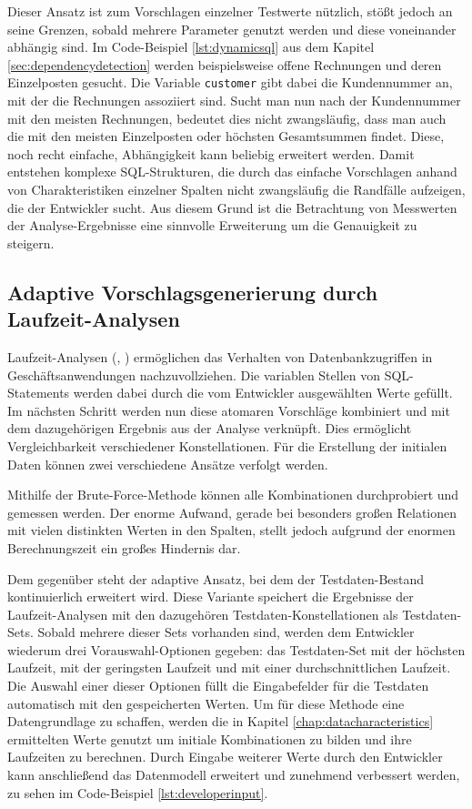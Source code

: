 Dieser Ansatz ist zum Vorschlagen einzelner Testwerte nützlich, stößt jedoch an seine Grenzen, sobald mehrere Parameter genutzt werden und diese voneinander abhängig sind.
Im Code-Beispiel \ref{lst:dynamicsql} aus dem Kapitel \ref{sec:dependencydetection} werden beispielsweise offene Rechnungen und deren Einzelposten gesucht.
Die Variable \texttt{customer} gibt dabei die Kundennummer an, mit der die Rechnungen assoziiert sind.
Sucht man nun nach der Kundennummer mit den meisten Rechnungen, bedeutet dies nicht zwangsläufig, dass man auch die mit den meisten Einzelposten oder höchsten Gesamtsummen findet.
Diese, noch recht einfache, Abhängigkeit kann beliebig erweitert werden.
Damit entstehen komplexe SQL-Strukturen, die durch das einfache Vorschlagen anhand von Charakteristiken einzelner Spalten nicht zwangsläufig die Randfälle aufzeigen, die der Entwickler sucht.
Aus diesem Grund ist die Betrachtung von Messwerten der Analyse-Ergebnisse eine sinnvolle Erweiterung um die Genauigkeit zu steigern.

\subsection{Adaptive Vorschlagsgenerierung durch Laufzeit-Analysen}
Laufzeit-Analysen (\cite{Exner2014}, \cite{Mues2014}) ermöglichen das Verhalten von Datenbankzugriffen in Geschäftsanwendungen nachzuvollziehen.
Die variablen Stellen von SQL-Statements werden dabei durch die vom Entwickler ausgewählten Werte gefüllt.
Im nächsten Schritt werden nun diese atomaren Vorschläge kombiniert und mit dem dazugehörigen Ergebnis aus der Analyse verknüpft.
Dies ermöglicht Vergleichbarkeit verschiedener Konstellationen.
Für die Erstellung der initialen Daten können zwei verschiedene Ansätze verfolgt werden.

Mithilfe der Brute-Force-Methode können alle Kombinationen durchprobiert und gemessen werden.
Der enorme Aufwand, gerade bei besonders großen Relationen mit vielen distinkten Werten in den Spalten, stellt jedoch aufgrund der enormen Berechnungszeit ein großes Hindernis dar.

Dem gegenüber steht der adaptive Ansatz, bei dem der Testdaten-Bestand kontinuierlich erweitert wird.
Diese Variante speichert die Ergebnisse der Laufzeit-Analysen mit den dazugehören Testdaten-Konstellationen als Testdaten-Sets.
Sobald mehrere dieser Sets vorhanden sind, werden dem Entwickler wiederum drei Vorauswahl-Optionen gegeben: das Testdaten-Set mit der höchsten Laufzeit, mit der geringsten Laufzeit und mit einer durchschnittlichen Laufzeit.
Die Auswahl einer dieser Optionen füllt die Eingabefelder für die Testdaten automatisch mit den gespeicherten Werten.
Um für diese Methode eine Datengrundlage zu schaffen, werden die in Kapitel \ref{chap:datacharacteristics} ermittelten Werte genutzt um initiale Kombinationen zu bilden und ihre Laufzeiten zu berechnen.
Durch Eingabe weiterer Werte durch den Entwickler kann anschließend das Datenmodell erweitert und zunehmend verbessert werden, zu sehen im Code-Beispiel \ref{lst:developerinput}.

